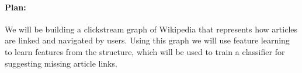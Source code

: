 \paragraph{Plan:} We will be building a clickstream graph of Wikipedia that represents how articles are linked and navigated by users. Using this graph we will use feature learning to learn features from the structure, which will be used to train a classifier for suggesting missing article links.





